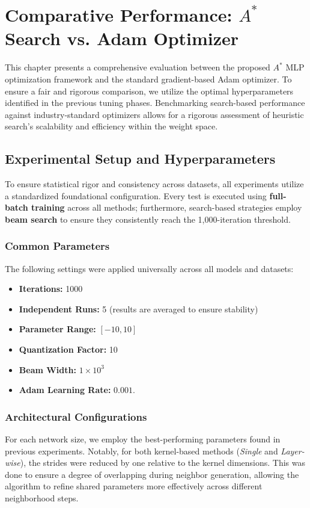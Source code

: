 \chapter{Comparative Performance: $A^*$ Search vs. Adam Optimizer}
\label{chap:astar_vs_adam}

This chapter presents a comprehensive evaluation between the proposed $A^*$ MLP optimization framework and the standard gradient-based Adam optimizer. To ensure a fair and rigorous comparison, we utilize the optimal hyperparameters identified in the previous tuning phases. Benchmarking search-based performance against industry-standard optimizers allows for a rigorous assessment of heuristic search's scalability and efficiency within the weight space.

\section{Experimental Setup and Hyperparameters}
\label{sec:experimental_setup}

To ensure statistical rigor and consistency across datasets, all experiments utilize a standardized foundational configuration. Every test is executed using \textbf{full-batch training} across all methods; furthermore, search-based strategies employ \textbf{beam search} to ensure they consistently reach the 1,000-iteration threshold.
\subsection{Common Parameters}
The following settings were applied universally across all models and datasets:
\begin{itemize}
    \item \textbf{Iterations:} 1000
    \item \textbf{Independent Runs:} 5 (results are averaged to ensure stability)
    \item \textbf{Parameter Range:} $[-10, 10]$
    \item \textbf{Quantization Factor:} 10
    \item \textbf{Beam Width:} $1 \times 10^3$ 
    \item \textbf{Adam Learning Rate:} $0.001$.
\end{itemize}

\subsection{Architectural Configurations}
For each network size, we employ the best-performing parameters found in previous experiments. Notably, for both kernel-based methods (\textit{Single} and \textit{Layer-wise}), the strides were reduced by one relative to the kernel dimensions. This was done to ensure a degree of overlapping during neighbor generation, allowing the algorithm to refine shared parameters more effectively across different neighborhood steps.

